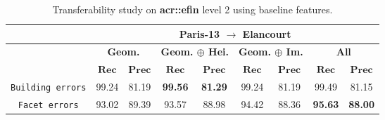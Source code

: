 \begin{table}[htbp]
\begin{tabular}{| c | c c | c c | c c | c c |}
                \hline
                \hline
                & \multicolumn{8}{c|}{\textbf{Paris-13 \(\rightarrow\) Elancourt}}\\
                \hline
                &\multicolumn{2}{c|}{\textbf{Geom.}} & \multicolumn{2}{c|}{\textbf{Geom. \(\oplus\) Hei.}} & \multicolumn{2}{c|}{\textbf{Geom. \(\oplus\) Im.}} & \multicolumn{2}{c|}{\textbf{All}} \\
                \cline{2-9}
                & \(\bm{Rec}\) & \(\bm{Prec}\) &  \(\bm{Rec}\) & \(\bm{Prec}\) &  \(\bm{Rec}\) & \(\bm{Prec}\) &  \(\bm{Rec}\) & \(\bm{Prec}\) \\
                \hline
                \texttt{Building errors} & 99.24 & 81.19 & \textbf{99.56} & \textbf{81.29} & 99.24 & 81.19 & 99.49 & 81.15 \\
                \hline
                \texttt{Facet errors} & 93.02 & 89.39 & 93.57 & 88.98 & 94.42 & 88.36 & \textbf{95.63} & \textbf{88.00} \\
                \hline
                \hline
            \end{tabular}
            \caption{
                \label{tab::transferability_f2}
                Transferability study on \textbf{\gls{acr::efin}} level 2 using baseline features.
            }
        \end{table}

